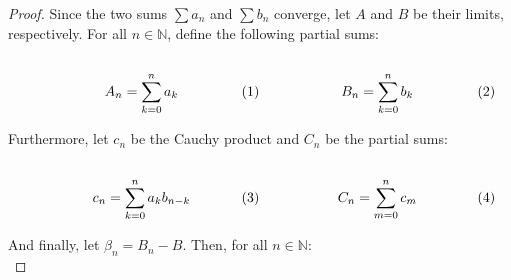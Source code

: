     \begin{proof}
        Since the two sums $\sum{a}_{n}$ and $\sum{b}_{n}$ converge,
        let $A$ and $B$ be their limits, respectively. For all
        $n\in\mathbb{N}$, define the following partial sums:
        \par
        \begin{subequations}
            \begin{minipage}[b]{0.49\textwidth}
                \centering
                \begin{equation}
                    A_{n}=\sum_{k=0}^{n}a_{k}
                \end{equation}
            \end{minipage}
            \hfill
            \begin{minipage}[b]{0.49\textwidth}
                \centering
                \begin{equation}
                    B_{n}=\sum_{k=0}^{n}b_{k}
                \end{equation}
            \end{minipage}
        \end{subequations}
        \par\vspace{2.5ex}
        Furthermore, let $c_{n}$ be the Cauchy product and $C_{n}$ be
        the partial sums:
        \par
        \begin{subequations}
            \begin{minipage}[b]{0.49\textwidth}
                \centering
                \begin{equation}
                    c_{n}=\sum_{k=0}^{n}a_{k}b_{n-k}
                \end{equation}
            \end{minipage}
            \hfill
            \begin{minipage}[b]{0.49\textwidth}
                \centering
                \begin{equation}
                    C_{n}=\sum_{m=0}^{n}c_{m}
                \end{equation}
            \end{minipage}
        \end{subequations}
        \par\vspace{2.5ex}
        And finally, let $\beta_{n}=B_{n}-B$. Then, for all
        $n\in\mathbb{N}$:
        \begin{equation}

\end{equation}
\end{proof}
